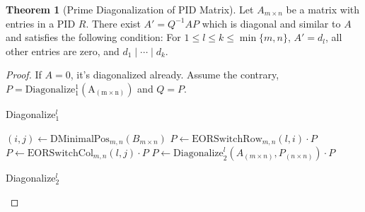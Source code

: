 \documentclass[10pt]{report}
\theoremstyle{definition}
\newtheorem{theorem}{Theorem}
\begin{document}
\begin{theorem}[Prime Diagonalization of PID Matrix]\label{theorem:diagonalize}
Let $A_{m\times n}$ be a matrix with entries in a PID $R$. There exist $A'=Q^{-1}AP$ which is diagonal and similar to $A$ and satisfies the following condition: For $1\leq l\leq k\leq\min\{m,n\}$, $A'=d_l$, all other entries are zero, and $d_1\mathbin{|}\cdots\mathbin{|}d_k$.
\end{theorem}
\begin{proof}
If $A=0$, it's diagonalized already. Assume the contrary, $P=\mathrm{Diagonalize^1_1(A_{(m\times n)})}$ and $Q=P$.

\begin{algorithm}[H]
\caption{Diagonalize$^l_1$}
\SetAlgoLined
{}
$(i,j)\gets\mathrm{DMinimalPos}_{m,n}(B_{m\times n})$\;
$P\gets\mathrm{EORSwitchRow}_{m,n}(l,i)\cdot P$\;
$P\gets\mathrm{EORSwitchCol}_{m,n}(l,j)\cdot P$\;
$P\gets\mathrm{Diagonalize}^l_2(A_{(m\times n)},P_{(n\times n)})\cdot P$\;
\end{algorithm}

\begin{algorithm}[H]
\caption{Diagonalize$^l_2$}
\SetAlgoLined
{}


\end{algorithm}
\end{proof}
\end{document}
